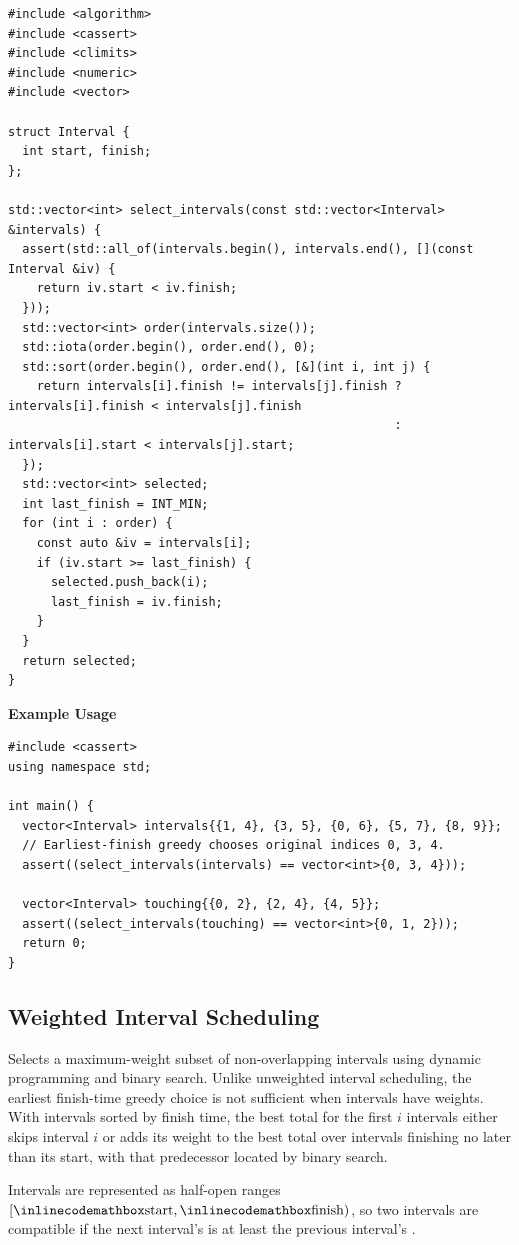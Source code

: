 \begin{lstlisting}[style=cpp]
#include <algorithm>
#include <cassert>
#include <climits>
#include <numeric>
#include <vector>

struct Interval {
  int start, finish;
};

std::vector<int> select_intervals(const std::vector<Interval> &intervals) {
  assert(std::all_of(intervals.begin(), intervals.end(), [](const Interval &iv) {
    return iv.start < iv.finish;
  }));
  std::vector<int> order(intervals.size());
  std::iota(order.begin(), order.end(), 0);
  std::sort(order.begin(), order.end(), [&](int i, int j) {
    return intervals[i].finish != intervals[j].finish ? intervals[i].finish < intervals[j].finish
                                                      : intervals[i].start < intervals[j].start;
  });
  std::vector<int> selected;
  int last_finish = INT_MIN;
  for (int i : order) {
    const auto &iv = intervals[i];
    if (iv.start >= last_finish) {
      selected.push_back(i);
      last_finish = iv.finish;
    }
  }
  return selected;
}
\end{lstlisting}
\textbf{Example Usage}\par
\begin{lstlisting}[style=cpp]
#include <cassert>
using namespace std;

int main() {
  vector<Interval> intervals{{1, 4}, {3, 5}, {0, 6}, {5, 7}, {8, 9}};
  // Earliest-finish greedy chooses original indices 0, 3, 4.
  assert((select_intervals(intervals) == vector<int>{0, 3, 4}));

  vector<Interval> touching{{0, 2}, {2, 4}, {4, 5}};
  assert((select_intervals(touching) == vector<int>{0, 1, 2}));
  return 0;
}
\end{lstlisting}
\subsection{Weighted Interval Scheduling}
\label{sec:1.5.3}
Selects a maximum-weight subset of non-overlapping intervals using dynamic programming and binary search. Unlike unweighted interval scheduling, the earliest finish-time greedy choice is not sufficient when intervals have weights. With intervals sorted by finish time, the best total for the first $i$ intervals either skips interval $i$ or adds its weight to the best total over intervals finishing no later than its start, with that predecessor located by binary search.

Intervals are represented as half-open ranges $[{\inlinecodemath{start}}, {\inlinecodemath{finish}})$, so two intervals are compatible if the next interval's  is at least the previous interval's .

